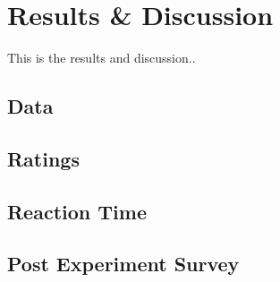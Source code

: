 \chapter{Results \& Discussion}

This is the results and discussion..

\section{Data}

\section{Ratings}

\section{Reaction Time}

\section{Post Experiment Survey}